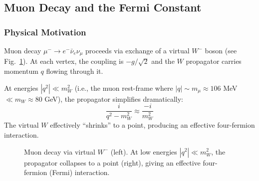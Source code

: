 \subsection{Muon Decay and the Fermi Constant}\label{subsec:lec19:fermi}

\subsubsection*{Physical Motivation}

Muon decay $\mu^-\to e^-\bar\nu_e\nu_\mu$ proceeds via exchange of a
virtual $W^-$ boson (see Fig.~\ref{fig:lec19:muon-decay}). At
each vertex, the coupling is $-g/\sqrt2$ and the $W$ propagator
carries momentum $q$ flowing through it.

At energies $|q^2| \ll m_W^2$ (i.e., the muon rest-frame where
$|q|\sim m_\mu \approx 106$ MeV $\ll m_W \approx 80$ GeV), the
propagator simplifies dramatically:
\begin{equation}
  \frac{i}{q^2 - m_W^2} \approx \frac{-i}{m_W^2}
  \label{eq:lec19:low-energy-propagator}
\end{equation}
The virtual $W$ effectively ``shrinks'' to a point, producing an
effective four-fermion interaction.

\begin{figure}[ht]
\centering
{}
\hspace{1.2cm}
\hspace{0.6cm}
\caption{Muon decay via virtual $W^-$ (left). At low energies
  $|q^2|\ll m_W^2$, the propagator collapses to a point (right),
  giving an effective four-fermion (Fermi) interaction.}
\label{fig:lec19:muon-decay}
\end{figure}

